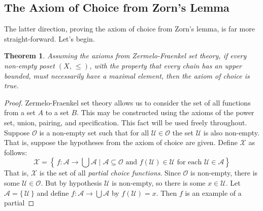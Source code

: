\documentclass{article}
\newtheorem{theorem}{Theorem}[section]
\theoremstyle{definition}
\begin{document}
        \subsection{The Axiom of Choice from Zorn's Lemma}
            The latter direction, proving the axiom of choice from Zorn's lemma,
            is far more straight-forward. Let's begin.
            \begin{theorem}
                Assuming the axioms from Zermelo-Fraenkel set theory, if
                every non-empty poset $(X,\,\leq)$, with the property that
                every chain has an upper bounded, must necessarily have a
                maximal element, then the axiom of choice is true.
            \end{theorem}
            \begin{proof}
                Zermelo-Fraenkel set theory allows us to consider the set of
                all functions from a set $A$ to a set $B$.  This may be
                constructed using the axioms of the power set, union, pairing,
                and specification. This fact will be used freely throughout.
                Suppose $\mathcal{O}$ is a non-empty
                set such that for all $\mathcal{U}\in\mathcal{O}$ the set
                $\mathcal{U}$ is also non-empty. That is, suppose the hypotheses
                from the axiom of choice are given. Define $\mathcal{X}$ as
                follows:
                \begin{equation}
                    \mathcal{X}
                    =\left\{\,
                        f:\mathcal{A}
                            \rightarrow\bigcup\mathcal{A}
                        \;\big|\;
                        \mathcal{A}
                        \subseteq\mathcal{O}
                        \textrm{ and }
                        f(\mathcal{U})\in\mathcal{U}
                        \textrm{ for each }
                        \mathcal{U}\in\mathcal{A}
                    \right\}
                \end{equation}
                That is, $\mathcal{X}$ is the set of all
                \textit{partial choice functions}. Since $\mathcal{O}$ is
                non-empty, there is some $\mathcal{U}\in\mathcal{O}$.
                But by hypothesis $\mathcal{U}$ is non-empty, so there is some
                $x\in\mathcal{U}$. Let
                $\mathcal{A}=\{\,\mathcal{U}\,\}$ and define
                $f:\mathcal{A}\rightarrow\bigcup\mathcal{A}$
                by $f(\mathcal{U})=x$. Then $f$ is an example of a partial

\end{proof}
\end{document}
